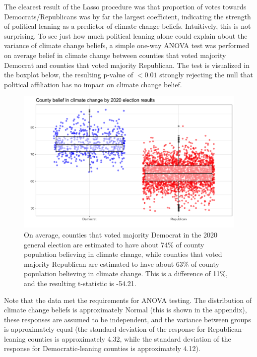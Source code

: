 \documentclass{article}
\begin{document}
The clearest result of the Lasso procedure was that proportion of votes towards Democrats/Republicans was by far the largest coefficient, indicating the strength of political leaning as a predictor of climate change beliefs. Intuitively, this is not surprising. To see just how much political leaning alone could explain about the variance of climate change beliefs, a simple one-way ANOVA test was performed on average belief in climate change between counties that voted majority Democrat and counties that voted majority Republican. The test is visualized in the boxplot below, the resulting p-value of $<0.01$ strongly rejecting the null that political affiliation has no impact on climate change belief.

\begin{figure}[H]
\centering
\includegraphics[scale=0.2]{images/election_party_anova.png}
\caption{On average, counties that voted majority Democrat in the 2020 general election are estimated to have about 74\% of county population believing in climate change, while counties that voted majority Republican are estimated to have about 63\% of county population believing in climate change. This is a difference of 11\%, and the resulting t-statistic is -54.21.}
\end{figure}

Note that the data met the requirements for ANOVA testing. The distribution of climate change beliefs is approximately Normal (this is shown in the appendix), these responses are assumed to be independent, and the variance between groups is approximately equal (the standard deviation of the response for Republican-leaning counties is approximately 4.32, while the standard deviation of the response for Democratic-leaning counties is approximately 4.12). 
\end{document}
